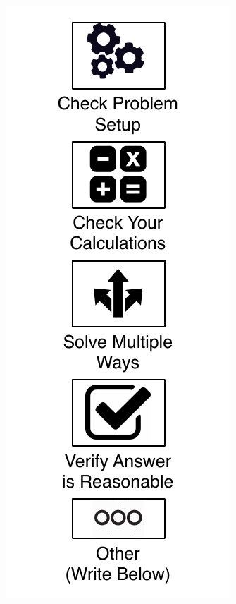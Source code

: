 \documentclass[11pt]{report}
\begin{document}
\begin{center}\includegraphics[scale=0.7]{accuracy.pdf}\end{center}
\end{document}
